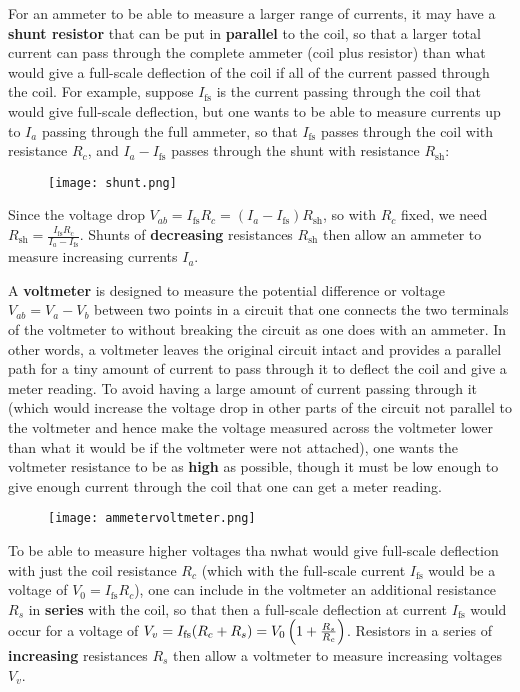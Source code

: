 For an ammeter to be able to measure a larger range of currents, it may have a \textbf{shunt resistor} that can be put in \textbf{parallel} to the coil, so that a larger total current can pass through the complete ammeter (coil plus resistor) than what would give a full-scale deflection of the coil if all of the current passed through the coil. For example, suppose $I_\text{fs}$ is the current passing through the coil that would give full-scale deflection, but one wants to be able to measure currents up to $I_a$ passing through the full ammeter, so that $I_\text{fs}$ passes through the coil with resistance $R_c$, and $I_a - I_\text{fs}$ passes through the shunt with resistance $R_\text{sh}$:

\begin{figure}[h]
\centering
\texttt{[image: shunt.png]}
\end{figure}

Since the voltage drop $V_{ab} = I_\text{fs}R_c = (I_a - I_\text{fs})R_\text{sh}$, so with $R_c$ fixed, we need $R_\text{sh} = \frac{I_\text{fs}R_c}{I_a - I_\text{fs}}$. Shunts of \textbf{decreasing} resistances $R_\text{sh}$ then allow an ammeter to measure increasing currents $I_a$.

A \textbf{voltmeter} is designed to measure the potential difference or voltage $V_{ab} = V_a - V_b$ between two points in a circuit that one connects the two terminals of the voltmeter to without breaking the circuit as one does with an ammeter. In other words, a voltmeter leaves the original circuit intact and provides a parallel path for a tiny amount of current to pass through it to deflect the coil and give a meter reading. To avoid having a large amount of current passing through it (which would increase the voltage drop in other parts of the circuit not parallel to the voltmeter and hence make the voltage measured across the voltmeter lower than what it would be if the voltmeter were not attached), one wants the voltmeter resistance to be as \textbf{high} as possible, though it must be low enough to give enough current through the coil that one can get a meter reading.

\begin{figure}[h]
\centering
\texttt{[image: ammetervoltmeter.png]}
\end{figure}

To be able to measure higher voltages tha nwhat would give full-scale deflection with just the coil resistance $R_c$ (which with the full-scale current $I_\text{fs}$ would be a voltage of $V_0 = I_\text{fs}R_c$), one can include in the voltmeter an additional resistance $R_s$ in \textbf{series} with the coil, so that then a full-scale deflection at current $I_\text{fs}$ would occur for a voltage of $V_v = I_\text{fs}(R_c + R_s) = V_0\left(  1 + \frac{R_s}{R_c}  \right)$. Resistors in a series of \textbf{increasing} resistances $R_s$ then allow a voltmeter to measure increasing voltages $V_v$.

